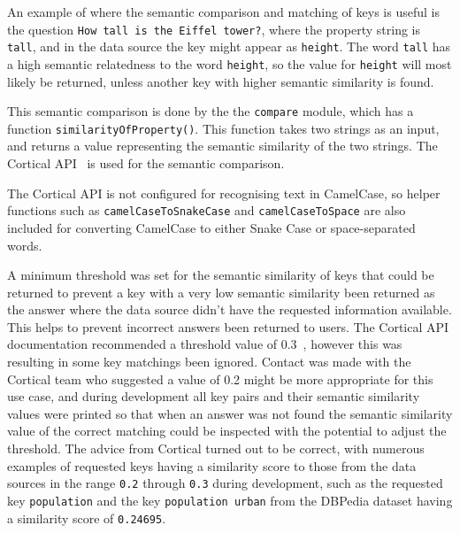 \documentclass[authoryearcitations]{UoYCSproject}
\begin{document}
An example of where the semantic comparison and matching of keys is useful is the question \texttt{How tall is the Eiffel tower?}, where the property string is \texttt{tall}, and in the data source the key might appear as \texttt{height}. The word \texttt{tall} has a high semantic relatedness to the word \texttt{height}, so the value for \texttt{height} will most likely be returned, unless another key with higher semantic similarity is found.

This semantic comparison is done by the the \texttt{compare} module, which has a function \texttt{similarityOfProperty()}. This function takes two strings as an input, and returns a value representing the semantic similarity of the two strings. The Cortical API~\cite{serviceCorticalSim} is used for the semantic comparison. 

The Cortical API is not configured for recognising text in CamelCase, so helper functions such as \texttt{camelCaseToSnakeCase} and \texttt{camelCaseToSpace} are also included for converting CamelCase to either Snake Case or space-separated words.

A minimum threshold was set for the semantic similarity of keys that could be returned to prevent a key with a very low semantic similarity been returned as the answer where the data source didn't have the requested information available. This helps to prevent incorrect answers been returned to users. The Cortical API documentation recommended a threshold value of 0.3~\cite{generalCorticalDoc}, however this was resulting in some key matchings been ignored. Contact was made with the Cortical team who suggested a value of 0.2 might be more appropriate for this use case, and during development all key pairs and their semantic similarity values were printed so that when an answer was not found the semantic similarity value of the correct matching could be inspected with the potential to adjust the threshold. The advice from Cortical turned out to be correct, with numerous examples of requested keys having a similarity score to those from the data sources in the range \texttt{0.2} through \texttt{0.3} during development, such as the requested key \texttt{population} and the key \texttt{population urban} from the DBPedia dataset having a similarity score of \texttt{0.24695}.
\end{document}
